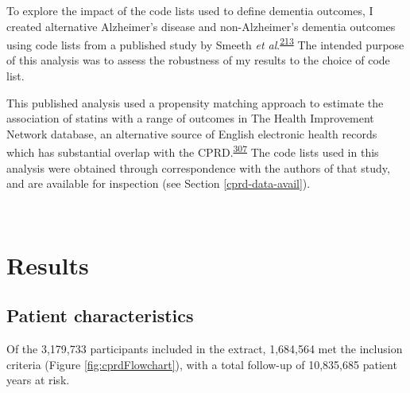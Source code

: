 \documentclass[a4paper, twoside]{templates/ociamthesis}
\begin{document}
To explore the impact of the code lists used to define dementia outcomes, I created alternative Alzheimer's disease and non-Alzheimer's dementia outcomes using code lists from a published study by Smeeth \emph{et al}.\textsuperscript{\protect\hyperlink{ref-smeeth2009}{213}} The intended purpose of this analysis was to assess the robustness of my results to the choice of code list.

This published analysis used a propensity matching approach to estimate the association of statins with a range of outcomes in The Health Improvement Network database, an alternative source of English electronic health records which has substantial overlap with the CPRD.\textsuperscript{\protect\hyperlink{ref-carbonari2015}{307}} The code lists used in this analysis were obtained through correspondence with the authors of that study, and are available for inspection (see Section \ref{cprd-data-avail}).

~

\hypertarget{results}{%
\section{Results}\label{results}}

\hypertarget{patient-characteristics}{%
\subsection{Patient characteristics}\label{patient-characteristics}}

Of the 3,179,733 participants included in the extract, 1,684,564 met the inclusion criteria (Figure \ref{fig:cprdFlowchart}), with a total follow-up of 10,835,685 patient years at risk.

~
\end{document}
